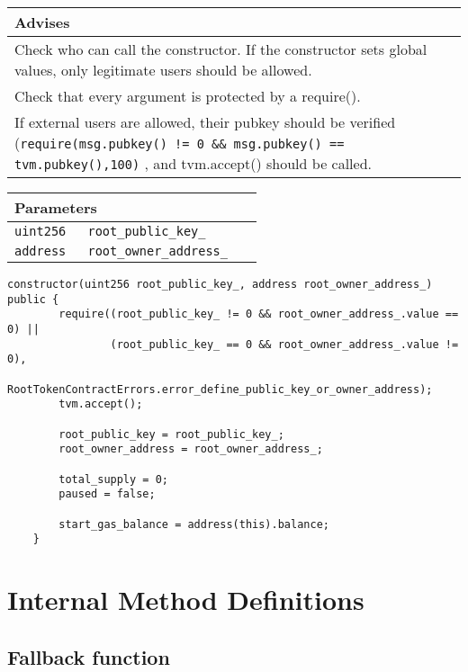 \ifsoldraft
\noindent\begin{tabular}{|p{12cm}|}\hline
\rowcolor{green}Advises
\\\hline
Check who can call the constructor. If the constructor sets global values, only legitimate users should be allowed.
\\\hline
Check that every argument is protected by a require().
\\\hline
If external users are allowed, their pubkey should be verified (\verb+require(msg.pubkey() != 0 && msg.pubkey() == tvm.pubkey(),100)+ , and tvm.accept() should be called.
\\\hline\end{tabular}
\fi

\ifsoltables
\noindent\begin{tabular}{|l|l|p{5cm}|}\hline
\multicolumn{3}{|l|}{\bf Parameters}\\\hline
\tt uint256 & \tt root\_{}public\_{}key\_{} &\\\hline
\tt address & \tt root\_{}owner\_{}address\_{} &\\\hline
\end{tabular}
\fi

\vspace{2cm}

\begin{lstlisting}[firstnumber=48]
    constructor(uint256 root_public_key_, address root_owner_address_) public {
        require((root_public_key_ != 0 && root_owner_address_.value == 0) ||
                (root_public_key_ == 0 && root_owner_address_.value != 0),
                RootTokenContractErrors.error_define_public_key_or_owner_address);
        tvm.accept();

        root_public_key = root_public_key_;
        root_owner_address = root_owner_address_;

        total_supply = 0;
        paused = false;

        start_gas_balance = address(this).balance;
    }
\end{lstlisting}

\section{Internal Method Definitions}


\subsection{Fallback function}

